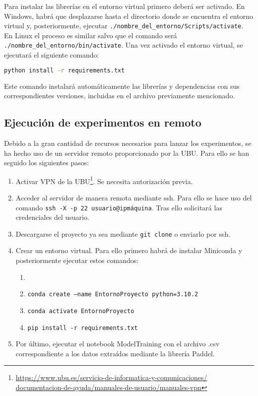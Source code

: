 Para instalar las librerías en el entorno virtual primero deberá ser activado. En Windows, habrá que desplazarse hasta el directorio donde se encuentra el entorno virtual y, posteriormente, ejecutar \texttt{./nombre\_del\_entorno/Scripts/activate}. En Linux el proceso es similar salvo que el comando será \texttt{./nombre\_del\_entorno/bin/activate}. Una vez activado el entorno virtual, se ejecutará el siguiente comando:

\begin{lstlisting}[language=bash, caption={Instalación dependencias y librerías}]
python install -r requirements.txt
\end{lstlisting}

Este comando instalará automáticamente las librerías y dependencias con sus correspondientes versiones, incluidas en el archivo previamente mencionado.

\subsection{Ejecución de experimentos en remoto}

Debido a la gran cantidad de recursos necesarios para lanzar los experimentos, se ha hecho uso de un servidor remoto proporcionado por la UBU. Para ello se han seguido los siguientes pasos:

\begin{enumerate}
\item Activar VPN de la UBU\footnote{\url{https://www.ubu.es/servicio-de-informatica-y-comunicaciones/
documentacion-de-ayuda/manuales-de-usuario/manuales-vpn}}. Se necesita autorización previa.
\item Acceder al servidor de manera remota mediante ssh. Para ello se hace uso del comando \texttt{ssh -X -p 22 usuario@ipmáquina}. Tras ello solicitará las credenciales del usuario.
\item Descargarse el proyecto ya sea mediante \texttt{git clone} o enviarlo por ssh.
\item Crear un entorno virtual. Para ello primero habrá de instalar Miniconda y posteriormente ejecutar estos comandos:
\begin{enumerate}
\item \texttt{}
\item \texttt{conda create --name EntornoProyecto python=3.10.2}
\item \texttt{conda activate EntornoProyecto}
\item \texttt{pip install -r requirements.txt}
\end{enumerate}
\item Por último, ejecutar el notebook ModelTraining con el archivo .csv correspondiente a los datos extraídos mediante la librería Paddel.
\end{enumerate}


